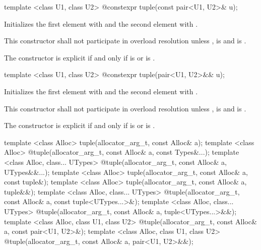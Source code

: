 %
%
\begin{itemdecl}
template <class U1, class U2> @\EXPLICIT@ constexpr tuple(const pair<U1, U2>& u);
\end{itemdecl}

\begin{itemdescr}
\pnum
\effects Initializes the first element with  and the
second element with .

\pnum
\remarks This constructor shall not participate in overload resolution unless
,
 is  and
 is .

\pnum
The constructor is explicit if and only if
 is  or
 is .
\end{itemdescr}

%
%
\begin{itemdecl}
template <class U1, class U2> @\EXPLICIT@ constexpr tuple(pair<U1, U2>&& u);
\end{itemdecl}

\begin{itemdescr}
\pnum
\effects Initializes the first element with
 and the
second element with .

\pnum
\remarks This constructor shall not participate in overload resolution unless
,
 is  and
 is .

\pnum
The constructor is explicit if and only if
 is  or
 is .
\end{itemdescr}

%
\begin{itemdecl}
template <class Alloc>
  tuple(allocator_arg_t, const Alloc& a);
template <class Alloc>
  @\EXPLICIT@ tuple(allocator_arg_t, const Alloc& a, const Types&...);
template <class Alloc, class... UTypes>
  @\EXPLICIT@ tuple(allocator_arg_t, const Alloc& a, UTypes&&...);
template <class Alloc>
  tuple(allocator_arg_t, const Alloc& a, const tuple&);
template <class Alloc>
  tuple(allocator_arg_t, const Alloc& a, tuple&&);
template <class Alloc, class... UTypes>
  @\EXPLICIT@ tuple(allocator_arg_t, const Alloc& a, const tuple<UTypes...>&);
template <class Alloc, class... UTypes>
  @\EXPLICIT@ tuple(allocator_arg_t, const Alloc& a, tuple<UTypes...>&&);
template <class Alloc, class U1, class U2>
  @\EXPLICIT@ tuple(allocator_arg_t, const Alloc& a, const pair<U1, U2>&);
template <class Alloc, class U1, class U2>
  @\EXPLICIT@ tuple(allocator_arg_t, const Alloc& a, pair<U1, U2>&&);
\end{itemdecl}

